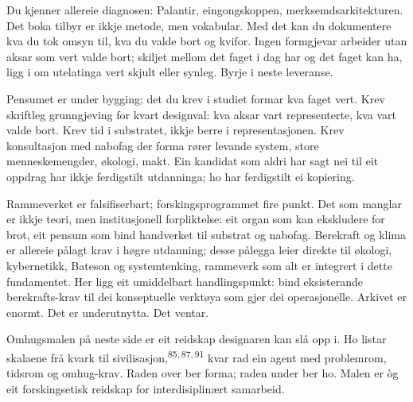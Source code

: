 \begin{widebody}
\begin{foreordbody}

\vspace{1mm}
\vspace{1mm}

Du kjenner allereie diagnosen: Palantir, eingongskoppen, merksemdsarkitekturen. Det boka tilbyr er ikkje metode, men vokabular. Med det kan du dokumentere kva du tok omsyn til, kva du valde bort og kvifor. Ingen formgjevar arbeider utan aksar som vert valde bort; skiljet mellom det faget i dag har og det faget kan ha, ligg i om utelatinga vert skjult eller synleg. Byrje i neste leveranse.

\vspace{3mm}
\vspace{1mm}

Pensumet er under bygging; det du krev i studiet formar kva faget vert. Krev skriftleg grunngjeving for kvart designval: kva aksar vart representerte, kva vart valde bort. Krev tid i substratet, ikkje berre i representasjonen. Krev konsultasjon med nabofag der forma rører levande system, store menneskemengder, økologi, makt. Ein kandidat som aldri har sagt nei til eit oppdrag har ikkje ferdigstilt utdanninga; ho har ferdigstilt ei kopiering.

\vspace{3mm}
\vspace{1mm}

Rammeverket er falsifiserbart; forskingsprogrammet fire punkt. Det som manglar er ikkje teori, men institusjonell forpliktelse: eit organ som kan ekskludere for brot, eit pensum som bind handverket til substrat og nabofag. Berekraft og klima er allereie pålagt krav i høgre utdanning; desse pålegga leier direkte til økologi, kybernetikk, Bateson og systemtenking, rammeverk som alt er integrert i dette fundamentet. Her ligg eit umiddelbart handlingspunkt: bind eksisterande berekrafts-krav til dei konseptuelle verktøya som gjer dei operasjonelle. Arkivet er enormt. Det er underutnytta. Det ventar.

\vspace{3mm}

Omhugsmalen på neste side er eit reidskap designaren kan slå opp i. Ho listar skalaene frå kvark til sivilisasjon,\textsuperscript{85,\,87,\,91} kvar rad ein agent med problemrom, tidsrom og omhug-krav. Raden over ber forma; raden under ber ho. Malen er òg eit forskingsetisk reidskap for interdisiplinært samarbeid.

\end{foreordbody}
\end{widebody}

